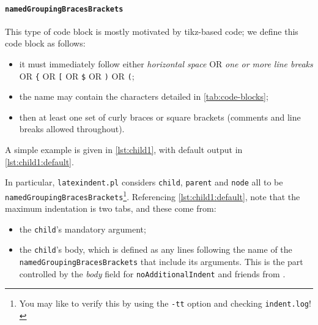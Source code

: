 	\paragraph{\texttt{namedGroupingBracesBrackets}}
		This type of code block is mostly motivated by tikz-based code; we define this code block as follows:
		\begin{itemize}
			\item it must immediately follow either \emph{horizontal space} OR \emph{one or more line breaks} OR \lstinline!{! OR \lstinline![!
			      OR \lstinline!$! OR \lstinline!)! OR \lstinline!(!;
			\item the name may contain the characters detailed in \vref{tab:code-blocks};
			\item then at least one set of curly braces or square brackets (comments and line breaks allowed throughout).
		\end{itemize}
		A simple example is given in \cref{lst:child1}, with default output in \cref{lst:child1:default}.

		\begin{minipage}{.45\textwidth}
		\end{minipage}%
		\hfill
		\begin{minipage}{.5\textwidth}
		\end{minipage}%

		In particular, \texttt{latexindent.pl} considers \texttt{child}, \texttt{parent} and \texttt{node} all to be \texttt{namedGroupingBracesBrackets}\footnote{
			You may like to verify this by using the \texttt{-tt} option and checking \texttt{indent.log}! }.
		Referencing \cref{lst:child1:default},
		note that the maximum indentation is two tabs, and these come from:
		\begin{itemize}
			\item the \lstinline!child!'s mandatory argument;
			\item the \lstinline!child!'s body, which is defined as any lines following the name of the \texttt{namedGroupingBracesBrackets}
			      that include its arguments. This is the part controlled by the \emph{body} field for \texttt{noAdditionalIndent}
			      and friends from .
		\end{itemize}

